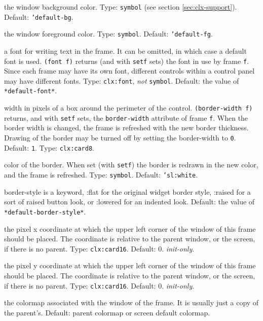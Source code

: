 \documentclass[twoside,openright,11pt]{report}
\newcommand{\tp}[1]{\texttt{#1}}
\begin{document}
{the window background color.  Type: \tp{symbol} (see section
\ref{sec:clx-support}). Default: \tp{'default-bg}.}

{the window foreground color.  Type: \tp{symbol}.  Default:
\tp{'default-fg}.}

{a font for writing text in the frame.  It can be omitted, in which
case a default font is used.  \tp{(font f)} returns (and with
\tp{setf} sets) the font in use by frame \tp{f}.  Since each
frame may have its own font, different controls within a control panel
may have different fonts.  Type: \tp{clx:font}, \emph{not}
\tp{symbol}.  Default: the value of \tp{*default-font*}.}

{width in pixels of a box around the perimeter of the control.
\tp{(border-width f)} returns, and with \tp{setf} sets, the
\tp{border-width} attribute of frame \tp{f}.  When the border
width is changed, the frame is refreshed with the new border
thickness.  Drawing of the border may be turned off by setting the
border-width to \tp{0}.  Default: \tp{1}.  Type:
\tp{clx:card8}.}

{color of the border.  When set (with \tp{setf}) the border is
redrawn in the new color, and the frame is refreshed.  Type:
\tp{symbol}.  Default: \tp{'sl:white}.}

{border-style is a keyword, :flat for the original widget border
style, :raised for a sort of raised button look, or :lowered for an
indented look.  Default: the value of \tp{*default-border-style*}.}

{the pixel x coordinate at which the upper left corner of the window
of this frame should be placed.  The coordinate is relative to the
parent window, or the screen, if there is no parent.  Type:
\tp{clx:card16}.  Default: 0. \textit{init-only}.}

{the pixel y coordinate at which the upper left corner of the window
of this frame should be placed.  The coordinate is relative to the
parent window, or the screen, if there is no parent.  Type:
\tp{clx:card16}.  Default: 0. \textit{init-only}.}

{the colormap associated with the window of the frame.  It is usually
just a copy of the parent's.  Default: parent colormap or screen
default colormap.}
\end{document}
